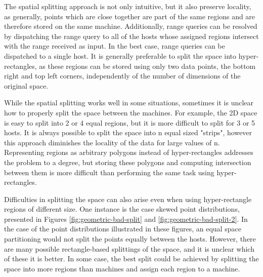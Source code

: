\documentclass[11pt,a4paper]{globis-book}
\begin{document}
The spatial splitting approach is not only intuitive, but it also preserve locality, as generally, points which are close together are part of the same regions and are therefore stored on the same machine. Additionally, range queries can be resolved by dispatching the range query to all of the hosts whose assigned regions intersect with the range received as input. In the best case, range queries can be dispatched to a single host. It is generally preferable to split the space into hyper-rectangles, as these regions can be stored using only two data points, the bottom right and top left corners, independently of the number of dimensions of the original space. 

While the spatial splitting works well in some situations, sometimes it is unclear how to properly split the space between the machines. For example, the 2D space is easy to split into 2 or 4 equal regions, but it is more difficult to split for 3 or 5 hosts. It is always possible to split the space into n equal sized "strips", however this approach diminishes the locality of the data for large values of n. Representing regions as arbitrary polygons instead of hyper-rectangles addresses the problem to a degree, but storing these polygons and computing intersection between them is more difficult than performing the same task using hyper-rectangles. 

Difficulties in splitting the space can also arise even when using hyper-rectangle regions of different size. One instance is the case skewed point distributions, presented in Figures \ref{fig:geometric-bad-split} and \ref{fig:geometric-bad-split-2}. In the case of the point distributions illustrated in these figures, an equal space partitioning would not split the points equally between the hosts. However, there are many possible rectangle-based splittings of the space, and it is unclear which of these it is better. In some case, the best split could be achieved by splitting the space into more regions than machines and assign each region to a machine.
\end{document}
